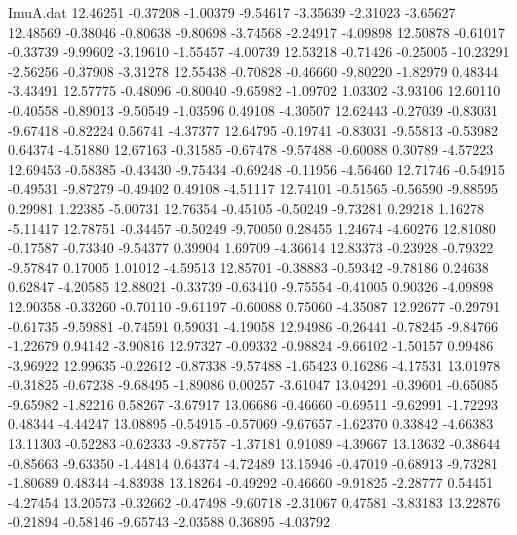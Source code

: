 \begin{filecontents}{ImuA.dat}
  12.46251   -0.37208   -1.00379   -9.54617   -3.35639   -2.31023   -3.65627
  12.48569   -0.38046   -0.80638   -9.80698   -3.74568   -2.24917   -4.09898
  12.50878   -0.61017   -0.33739   -9.99602   -3.19610   -1.55457   -4.00739
  12.53218   -0.71426   -0.25005  -10.23291   -2.56256   -0.37908   -3.31278
  12.55438   -0.70828   -0.46660   -9.80220   -1.82979    0.48344   -3.43491
  12.57775   -0.48096   -0.80040   -9.65982   -1.09702    1.03302   -3.93106
  12.60110   -0.40558   -0.89013   -9.50549   -1.03596    0.49108   -4.30507
  12.62443   -0.27039   -0.83031   -9.67418   -0.82224    0.56741   -4.37377
  12.64795   -0.19741   -0.83031   -9.55813   -0.53982    0.64374   -4.51880
  12.67163   -0.31585   -0.67478   -9.57488   -0.60088    0.30789   -4.57223
  12.69453   -0.58385   -0.43430   -9.75434   -0.69248   -0.11956   -4.56460
  12.71746   -0.54915   -0.49531   -9.87279   -0.49402    0.49108   -4.51117
  12.74101   -0.51565   -0.56590   -9.88595    0.29981    1.22385   -5.00731
  12.76354   -0.45105   -0.50249   -9.73281    0.29218    1.16278   -5.11417
  12.78751   -0.34457   -0.50249   -9.70050    0.28455    1.24674   -4.60276
  12.81080   -0.17587   -0.73340   -9.54377    0.39904    1.69709   -4.36614
  12.83373   -0.23928   -0.79322   -9.57847    0.17005    1.01012   -4.59513
  12.85701   -0.38883   -0.59342   -9.78186    0.24638    0.62847   -4.20585
  12.88021   -0.33739   -0.63410   -9.75554   -0.41005    0.90326   -4.09898
  12.90358   -0.33260   -0.70110   -9.61197   -0.60088    0.75060   -4.35087
  12.92677   -0.29791   -0.61735   -9.59881   -0.74591    0.59031   -4.19058
  12.94986   -0.26441   -0.78245   -9.84766   -1.22679    0.94142   -3.90816
  12.97327   -0.09332   -0.98824   -9.66102   -1.50157    0.99486   -3.96922
  12.99635   -0.22612   -0.87338   -9.57488   -1.65423    0.16286   -4.17531
  13.01978   -0.31825   -0.67238   -9.68495   -1.89086    0.00257   -3.61047
  13.04291   -0.39601   -0.65085   -9.65982   -1.82216    0.58267   -3.67917
  13.06686   -0.46660   -0.69511   -9.62991   -1.72293    0.48344   -4.44247
  13.08895   -0.54915   -0.57069   -9.67657   -1.62370    0.33842   -4.66383
  13.11303   -0.52283   -0.62333   -9.87757   -1.37181    0.91089   -4.39667
  13.13632   -0.38644   -0.85663   -9.63350   -1.44814    0.64374   -4.72489
  13.15946   -0.47019   -0.68913   -9.73281   -1.80689    0.48344   -4.83938
  13.18264   -0.49292   -0.46660   -9.91825   -2.28777    0.54451   -4.27454
  13.20573   -0.32662   -0.47498   -9.60718   -2.31067    0.47581   -3.83183
  13.22876   -0.21894   -0.58146   -9.65743   -2.03588    0.36895   -4.03792

\end{filecontents}
